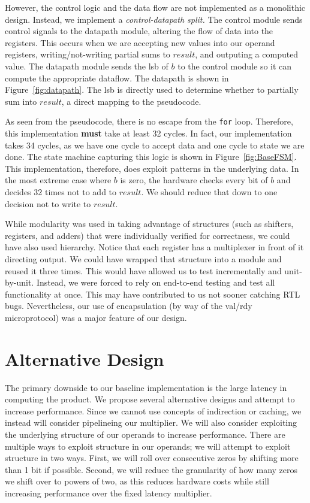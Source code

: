 \documentclass[10pt]{article}
\begin{document}
However, the control logic and the data flow are not implemented as a monolithic design.
Instead, we implement a \textit{control-datapath split.}
The control module sends control signals to the datapath module, altering the flow of data into the registers.
This occurs when we are accepting new values into our operand registers,
writing/not-writing partial sums to $result$, and outputing a computed value.
The datapath module sends the lsb of $b$ to the control module so it can compute the appropriate dataflow.
The datapath is shown in Figure~\ref{fig:datapath}.
The lsb is directly used to determine whether to partially sum into $result$, a direct mapping to the pseudocode.

As seen from the pseudocode, there is no escape from the \verb+for+ loop.
Therefore, this implementation \textbf{must} take at least 32 cycles.
In fact, our implementation takes 34 cycles, as we have one cycle to accept data and one cycle to state we are done.
The state machine capturing this logic is shown in Figure~\ref{fig:BaseFSM}. 
This implementation, therefore, does exploit patterns in the underlying data.
In the most extreme case where $b$ is zero, the hardware checks every bit of $b$ and decides 32 times not to add to $result$.
We should reduce that down to one decision not to write to $result$.

While modularity was used in taking advantage of structures (such as shifters, registers, and adders) that were individually verified for correctness, we could have also used hierarchy. Notice that each register has a multiplexer in front of it directing output.
We could have wrapped that structure into a module and reused it three times. 
This would have allowed us to test incrementally and unit-by-unit.
Instead, we were forced to rely on end-to-end testing and test all functionality at once. This may have contributed to us not sooner catching RTL bugs.
Nevertheless, our use of encapsulation (by way of the val/rdy microprotocol) was a major feature of our design.

\section{Alternative Design}

The primary downside to our baseline implementation is the large latency in computing the product.
We propose several alternative designs and attempt to increase performance.
Since we cannot use concepts of indirection or caching, we instead will consider pipelineing our multiplier.
We will also consider exploiting the underlying structure of our operands to increase performance.
There are multiple ways to exploit structure in our operands; we will attempt to exploit structure in two ways.
First, we will roll over consecutive zeros by shifting more than 1 bit if possible.
Second, we will reduce the granularity of how many zeros we shift over to powers of two, as this reduces hardware costs
while still increasing performance over the fixed latency multiplier.
\end{document}
